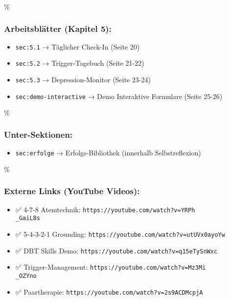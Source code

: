 \hypertarget{arbeitsbluxe4tter-kapitel-5}{\%
\subsubsection{\texorpdfstring{\textbf{Arbeitsblätter (Kapitel 5):}}{Arbeitsblätter (Kapitel 5):}}\label{arbeitsbluxe4tter-kapitel-5}}

\begin{itemize}
\tightlist
\item
  \texttt{sec:5.1} → Täglicher Check-In (Seite 20)
\item
  \texttt{sec:5.2} → Trigger-Tagebuch (Seite 21-22)
\item
  \texttt{sec:5.3} → Depression-Monitor (Seite 23-24)
\item
  \texttt{sec:demo-interactive} → Demo Interaktive Formulare (Seite 25-26)
\end{itemize}

\hypertarget{unter-sektionen}{\%
\subsubsection{\texorpdfstring{\textbf{Unter-Sektionen:}}{Unter-Sektionen:}}\label{unter-sektionen}}

\begin{itemize}
\tightlist
\item
  \texttt{sec:erfolge} → Erfolgs-Bibliothek (innerhalb Selbstreflexion)
\end{itemize}

\hypertarget{externe-links-youtube-videos}{\%
\subsubsection{\texorpdfstring{\textbf{Externe Links (YouTube Videos):}}{Externe Links (YouTube Videos):}}\label{externe-links-youtube-videos}}

\begin{itemize}
\tightlist
\item
  ✅ 4-7-8 Atemtechnik: \texttt{https://youtube.com/watch?v=YRPh\\_GaiL8s}
\item
  ✅ 5-4-3-2-1 Grounding: \texttt{https://youtube.com/watch?v=utUVx0ayoYw}
\item
  ✅ DBT Skills Demo: \texttt{https://youtube.com/watch?v=q15eTySnWxc}
\item
  ✅ Trigger-Management: \texttt{https://youtube.com/watch?v=Mz3Mi\\_OZYno}
\item
  ✅ Paartherapie: \texttt{https://youtube.com/watch?v=2s9ACDMcpjA}
\end{itemize}

